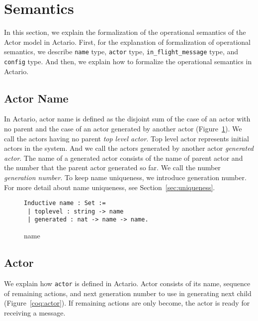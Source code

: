 \section{Semantics}
\label{sec:semantics}

In this section, we explain the formalization of the operational semantics of the Actor model in Actario.
First, for the explanation of formalization of operational semantics, we describe \lstinline|name| type, \lstinline|actor| type, \lstinline|in_flight_message| type, and \lstinline|config| type.
And then, we explain how to formalize the operational semantics in Actario.

\subsection{Actor Name}
In Actario, actor name is defined as the disjoint sum of the case of an actor with no parent and the case of an actor generated by another actor (Figure~\ref{coq:name}).
We call the actors having no parent \textit{top level actor}.
Top level actor represents initial actors in the system.
And we call the actors generated by another actor \textit{generated actor}.
The name of a generated actor consists of the name of parent actor and the number that the parent actor generated so far.
We call the number \textit{generation number}.
To keep name uniqueness, we introduce generation number.
For more detail about name uniqueness, see Section~\ref{sec:uniqueness}.


\begin{figure}[t]
\begin{lstlisting}
Inductive name : Set :=
 | toplevel : string -> name
 | generated : nat -> name -> name.
\end{lstlisting}
\caption{name}\label{coq:name}
\end{figure}


\subsection{Actor}
We explain how \lstinline|actor| is defined in Actario.
Actor consists of its name, sequence of remaining actions, and next generation number to use in generating next child (Figure~\ref{coq:actor}).
If remaining actions are only \textsf{become}, the actor is ready for receiving a message.

